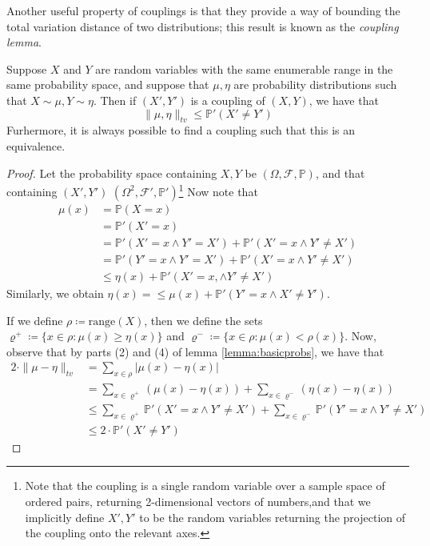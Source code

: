 	Another useful property of couplings is that they provide a way of bounding the total 
	variation distance of two distributions; this result is known as the \emph{coupling lemma}.
	\begin{lemma}
		\label{lemma:coupling}
		Suppose $X$ and $Y$ are random variables with the same enumerable range in the same 
		probability space, and suppose
		that $\mu, \eta$ are probability distributions such that $X \sim \mu, Y \sim \eta$.
		Then if $(X',Y')$ is a coupling of $(X, Y)$, we have that 
		$$
			\|\mu, \eta\|_{tv} \leq \mathbb{P}'(X' \neq Y')
		$$
		Furhermore, it is always possible to find a coupling such that this is an 
		equivalence.
	\end{lemma}
	\begin{proof}
		Let the probability space containing $X, Y$ be $(\Omega, \mathcal{F}, \mathbb{P})$,
		and that containing $(X',Y')$ $(\Omega^2, \mathcal{F}', \mathbb{P}')$\footnote{Note 
		that the coupling is a single random variable over a sample space of ordered pairs, 
		returning 2-dimensional vectors of numbers,and that we implicitly define $X', Y'$ to 
		be the random variables returning the projection of the coupling onto the relevant 
		axes.} Now note that
		\begin{align*}
			\mu(x) &= \mathbb{P}(X=x) \\
			       &= \mathbb{P}'(X'=x) \\
			       &= \mathbb{P}'(X'=x \land Y'=X') + \mathbb{P}'(X'=x \land Y'\neq X')\\
			       &= \mathbb{P}'(Y'=x \land Y'=X') + \mathbb{P}'(X'=x \land Y'\neq X')\\
			       &\leq \eta(x) + \mathbb{P}'(X'=x, \land Y'\neq X')
		\end{align*}
		Similarly, we obtain $\eta(x) = \leq \mu(x) + \mathbb{P}'(Y'=x\land X'\neq Y')$.

		If we define $\rho \coloneqq \mathrm{range}(X)$, then we define the sets $\varrho^+ 
		\coloneqq \{x \in \rho : \mu(x) \geq \eta(x)\}$ and $\varrho^- \coloneqq
		\{x \in \rho : \mu(x) < \rho(x)\}$. Now, observe that by parts (2) and (4) of 
		lemma \ref{lemma:basicprobs}, we have that 
		\begin{align*}
			2 \cdot \|\mu - \eta\|_{tv} &= \sum_{x \in \rho} |\mu(x) - \eta(x)| \\
			&= \sum_{x \in \varrho^+} (\mu(x) - \eta(x)) + 
			   \sum_{x \in \varrho^-} (\eta(x) - \eta(x)) \\
			&\leq \sum_{x \in \varrho^+} \mathbb{P}'(X'=x \land Y' \neq X') 
			+ \sum_{x \in \varrho^-} \mathbb{P}'(Y'=x \land Y' \neq X') \\
			&\leq 2 \cdot \mathbb{P}'(X' \neq Y')
		\end{align*}


\end{proof}
